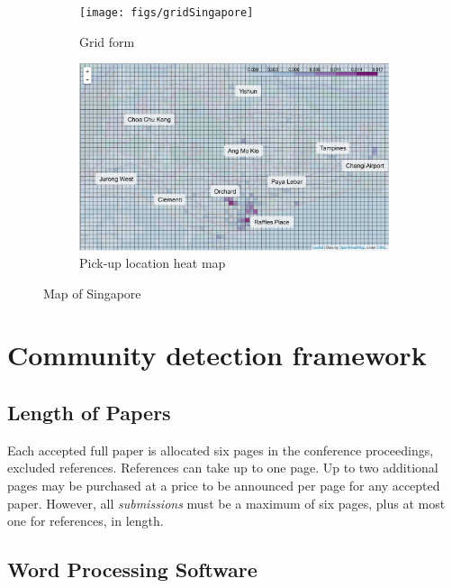 \documentclass{article}
\begin{document}
\begin{figure} 
\centering
\begin{subfigure}{.5\linewidth}
  \centering
  \texttt{[image: figs/gridSingapore]}
  \caption{Grid form}
  \label{fig:gridSingapore}
\end{subfigure}%
\begin{subfigure}{.5\linewidth}
  \centering
  \includegraphics[width=0.9\linewidth]{figs/locationHeatMap}
  \caption{Pick-up location heat map}
  \label{fig:locationHeatMap}
\end{subfigure}
\vspace{-0.3 cm}
\caption{Map of Singapore}
\label{fig:mapSingapore}
\vspace{-0.5 cm}
\end{figure}


\section{Community detection framework} \label{sec:comDectectionFramework}




\subsection{Length of Papers}

Each accepted full paper is allocated six pages in the conference 
proceedings, excluded references. References can take up to one page.
Up to two additional pages may be purchased at a price 
to be announced per page for any accepted paper. However, all 
{\em submissions} must 
be a maximum of six pages, plus at most one for references, in length.


\subsection{Word Processing Software}
\end{document}

